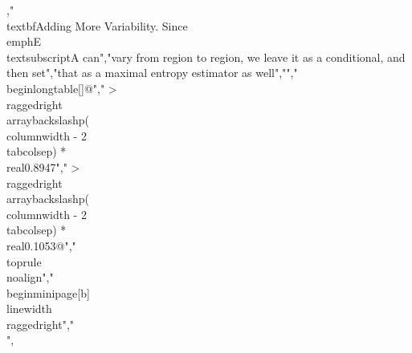 {{{{{{{,"\\textbf{Adding More Variability.} Since \\emph{E\\textsubscript{A}} can","vary from region to region, we leave it as a conditional, and then set","that as a maximal entropy estimator as well","","\\begin{longtable}[]{@{}","  >{\\raggedright\\arraybackslash}p{(\\columnwidth - 2\\tabcolsep) * \\real{0.8947}}","  >{\\raggedright\\arraybackslash}p{(\\columnwidth - 2\\tabcolsep) * \\real{0.1053}}@{}}","\\toprule\\noalign{}","\\begin{minipage}[b]{\\linewidth}\\raggedright","\\[p\\left( E_{i} \\right) = \\ \\alpha \\bullet e^{- \\alpha E_{i}}\\]",}}}}}}}
